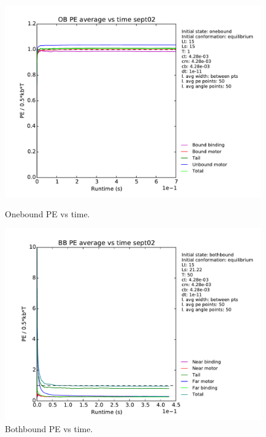 \documentclass[10pt]{article} %
\begin{document}
\begin{figure}[h!]
  \centering
  \begin{minipage}[b]{0.49\textwidth}
    \includegraphics[width=\textwidth]{../figures/OB_Average_PE.pdf}
    \caption{Onebound PE vs time.}
  \end{minipage}
  \begin{minipage}[b]{0.49\textwidth}
    \includegraphics[width=\textwidth]{../figures/BB_Average_PE.pdf}
    \caption{Bothbound PE vs time.}
  \end{minipage}
  \label{equipartition_agreement}
\end{figure}
\end{document}

